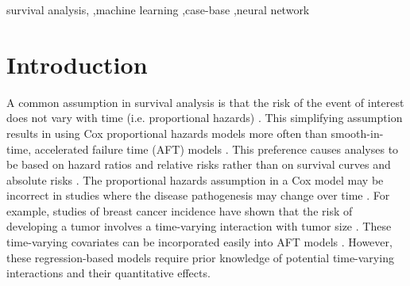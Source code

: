\documentclass[preprint,12pt,authoryear]{elsarticle}
\begin{document}
\begin{frontmatter}
\begin{keyword}
survival analysis, \sep machine learning \sep case-base \sep neural network
\end{keyword}

\end{frontmatter}



\hypertarget{introduction}{%
\section{Introduction}\label{introduction}}





A common assumption in survival analysis is that the risk of the event of interest does not vary with
time (i.e. proportional hazards) \citep{hanley2009}. This simplifying assumption results in using Cox proportional
hazards models more often than smooth-in-time, accelerated failure time (AFT) models \citep{hanley2009}. This
preference causes analyses to be based on hazard ratios and relative risks rather than on survival curves and
absolute risks \citep{hanley2009}. The proportional hazards assumption in a Cox model may be incorrect in studies
where the disease pathogenesis may change over time \citep{coradini2000time}. For example, studies of breast cancer
incidence have shown that the risk of developing a tumor involves a time-varying interaction with tumor size
\citep{coradini2000time}. These time-varying covariates can be incorporated easily into AFT models \citep{royston2002flexible}.
However, these regression-based models require prior knowledge of potential
time-varying interactions and their quantitative effects.
\end{document}
